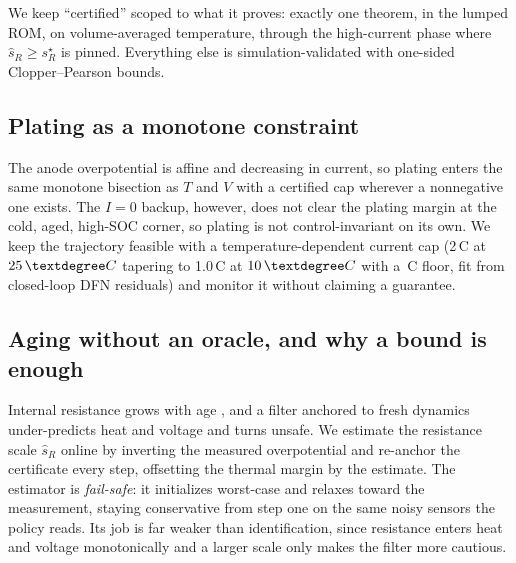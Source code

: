 \documentclass[conference]{IEEEtran}
\newcommand{\SI}[2]{#1\,#2}
\newcommand{\degreeCelsius}{\textdegree C}
\begin{document}
We keep ``certified'' scoped to what it proves: exactly one theorem, in the lumped ROM, on
volume-averaged temperature, through the high-current phase where $\hat s_R\ge s_R^\star$ is pinned.
Everything else is simulation-validated with one-sided Clopper--Pearson bounds.

\subsection{Plating as a monotone constraint}
The anode overpotential is affine and decreasing in current, so plating enters the same monotone
bisection as $T$ and $V$ with a certified cap wherever a nonnegative one exists. The $I{=}0$ backup,
however, does not clear the plating margin at the cold, aged, high-SOC corner, so plating is not
control-invariant on its own. We keep the trajectory feasible with a temperature-dependent current cap
(\SI{2}{C} at $\SI{25}{\degreeCelsius}$ tapering to \SI{1.0}{C} at $\SI{10}{\degreeCelsius}$ with a
\SI{\platCapFloor}{C} floor, fit from
closed-loop DFN residuals) and monitor it without claiming a guarantee.

\subsection{Aging without an oracle, and why a bound is enough}
\label{sec:method-aging}
Internal resistance grows with age \cite{kirkaldy2024}, and a filter anchored to fresh
dynamics under-predicts heat and voltage and turns unsafe. We estimate the resistance scale $\hat s_R$
online by inverting the measured overpotential \cite{plett2015,waag2014} and re-anchor the certificate
every step, offsetting the thermal margin by the estimate. The estimator is \emph{fail-safe}: it
initializes worst-case and relaxes toward the measurement, staying conservative from step one on the
same noisy sensors the policy reads. Its job is far weaker than identification, since resistance enters
heat and voltage monotonically and a larger scale only makes the filter more cautious.
\end{document}
